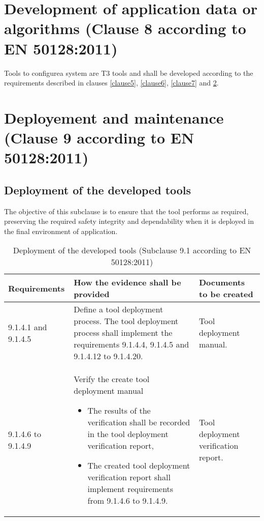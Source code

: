 \documentclass{template/openetcs_report}
\begin{document}
\section{Development of application data or algorithms (Clause 8 according to EN 50128:2011)}
Tools to configurea system are T3 tools and shall be developed according to the requirements described in clauses \ref{clause5}, \ref{clause6}, \ref{clause7} and \ref{clause9}.
\linebreak
\linebreak


\section{Deployement and maintenance (Clause 9 according to EN 50128:2011)}
\label{clause9}
\subsection{Deployment of the developed tools}
\begin{flushleft}
The objective of this subclause is to ensure that the tool performs as required, preserving the required safety integrity and dependability when it is deployed in the final environment of application.
\end{flushleft}
{\footnotesize\sffamily\centering
\begin{longtable}{|p{2cm}|p{9cm}|p{3cm}|}
\caption{Deployment of the developed tools (Subclause 9.1 according to EN 50128:2011)}\\
\hline
\bfseries Requirements & \bfseries How the evidence shall be provided & \bfseries Documents to be created\\
\hline
\hline
\endhead
\hline
\endfoot

9.1.4.1 and 9.1.4.5 & Define a tool deployment process.
The tool deployment process shall implement the requirements 9.1.4.4, 9.1.4.5 and 9.1.4.12 to 9.1.4.20.
& Tool deployment manual.\\ 
\hline
9.1.4.6 to 9.1.4.9 & Verify the create tool deployment manual
\begin{itemize}\itemsep=0pt
  \item The results of the verification shall be recorded in the tool deployment verification report,
  \item The created tool deployment verification report shall implement requirements from 9.1.4.6 to 9.1.4.9. 
\end{itemize}
& Tool deployment verification report.\\ 
\hline
\end{longtable}}
\end{document}
